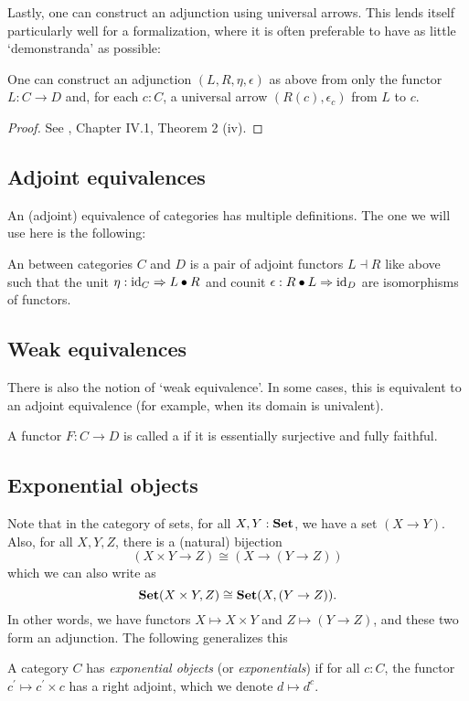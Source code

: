 Lastly, one can construct an adjunction using universal arrows. This lends itself particularly well for a formalization, where it is often preferable to have as little `demonstranda' as possible:
\begin{lemma}
  One can construct an adjunction $ (L, R, \eta, \epsilon) $ as above from only the functor $ L: C \to D $ and, for each $ c: C $, a universal arrow $ (R(c), \epsilon_c) $ from $ L $ to $ c $.
\end{lemma}
\begin{proof}
  See \autocite{MacLane}, Chapter IV.1, Theorem 2 (iv).
\end{proof}

\subsection{Adjoint equivalences}
An (adjoint) equivalence of categories has multiple definitions. The one we will use here is the following:

\begin{definition}\label{def:equivalence-of-categories}
  An  between categories $ C $ and $ D $ is a pair of adjoint functors $ L \dashv R $ like above such that the unit $ \eta: \text{id}_{C} \Rightarrow L \bullet R $ and counit $ \epsilon: R \bullet L \Rightarrow \text{id}_{D} $ are isomorphisms of functors.
\end{definition}

\subsection{Weak equivalences}
There is also the notion of `weak equivalence'. In some cases, this is equivalent to an adjoint equivalence (for example, when its domain is univalent).
\begin{definition}
  A functor $ F: C \to D $ is called a  if it is essentially surjective and fully faithful.
\end{definition}

\subsection{Exponential objects}
Note that in the category of sets, for all $ X, Y: \mathbf{Set} $, we have a set $ (X \to Y) $. Also, for all $ X, Y, Z $, there is a (natural) bijection
\[ (X \times Y \to Z) \cong (X \to (Y \to Z)) \]
which we can also write as
\[ \mathbf{Set}(X \times Y, Z) \cong \mathbf{Set}(X, (Y \to Z)). \]
In other words, we have functors $ X \mapsto X \times Y $ and $ Z \mapsto (Y \to Z) $, and these two form an adjunction. The following generalizes this
\begin{definition}
  A category $ C $ has \textit{exponential objects} (or \textit{exponentials}) if for all $ c: C $, the functor $ c^\prime \mapsto c^\prime \times c $ has a right adjoint, which we denote $ d \mapsto d^c $.
\end{definition}

